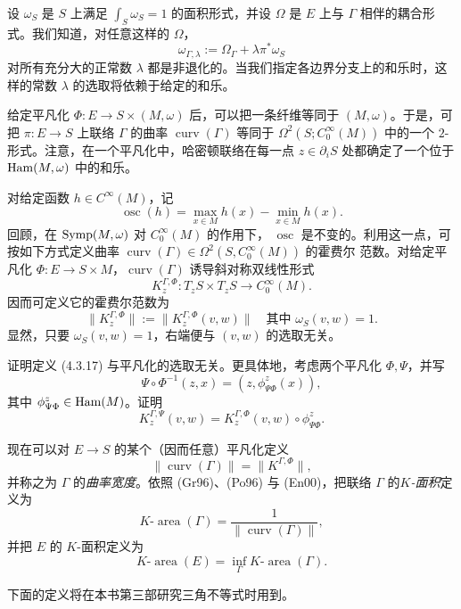设 $\omega_S$ 是 $S$ 上满足 $\int_S\omega_S=1$ 的面积形式，并设
$\Omega$ 是 $E$ 上与 $\Gamma$ 相伴的耦合形式。我们知道，对任意这样的
$\Omega$，
\[
 \omega_{\Gamma,\lambda}:=\Omega_\Gamma+\lambda\pi^*\omega_S
\]
对所有充分大的正常数 $\lambda$ 都是非退化的。当我们指定各边界分支上的和乐时，这样的常数 $\lambda$ 的选取将依赖于给定的和乐。

给定平凡化 $\Phi:E\to S\times(M,\omega)$ 后，可以把一条纤维等同于
$(M,\omega)$。于是，可把 $\pi:E\to S$ 上联络 $\Gamma$ 的曲率
$\operatorname{curv}(\Gamma)$ 等同于
$\Omega^2(S;C_0^\infty(M))$ 中的一个 $2$-形式。注意，在一个平凡化中，哈密顿联络在每一点 $z\in\partial_iS$ 处都确定了一个位于
$\operatorname{Ham}(M,\omega)$ 中的和乐。

对给定函数 $h\in C^\infty(M)$，记
\[
 \operatorname{osc}(h)=\max_{x\in M}h(x)-\min_{x\in M}h(x).
\]
回顾，在 $\operatorname{Symp}(M,\omega)$ 对 $C_0^\infty(M)$ 的作用下，
$\operatorname{osc}$ 是不变的。利用这一点，可按如下方式定义曲率
$\operatorname{curv}(\Gamma)\in\Omega^2(S,C_0^\infty(M))$ 的霍费尔
范数。对给定平凡化 $\Phi:E\to S\times M$，$\operatorname{curv}(\Gamma)$
诱导斜对称双线性形式
\[
 K_z^{\Gamma,\Phi}:T_zS\times T_zS\longrightarrow C_0^\infty(M).
\]
因而可定义它的霍费尔范数为
\begin{equation}
 \|K_z^{\Gamma,\Phi}\|:=
 \|K_z^{\Gamma,\Phi}(v,w)\|
 \quad\text{其中 }\omega_S(v,w)=1.
 \label{eq:curvature-hofer-norm}
\end{equation}
显然，只要 $\omega_S(v,w)=1$，右端便与 $(v,w)$ 的选取无关。

\begin{exercise}\label{ex:curvature-norm-trivialization-independent}
证明定义 (4.3.17) 与平凡化的选取无关。更具体地，考虑两个平凡化
$\Phi,\Psi$，并写
\[
 \Psi\circ\Phi^{-1}(z,x)
 =(z,\phi_{\Psi\Phi}^z(x)),
\]
其中 $\phi_{\Psi\Phi}^z\in\operatorname{Ham}(M)$。证明
\[
 K_z^{\Gamma,\Psi}(v,w)
 =K_z^{\Gamma,\Phi}(v,w)\circ\phi_{\Psi\Phi}^z.
\]
\end{exercise}

现在可以对 $E\to S$ 的某个（因而任意）平凡化定义
\[
 \|\operatorname{curv}(\Gamma)\|=\|K^{\Gamma,\Phi}\|,
\]
并称之为 $\Gamma$ 的\emph{曲率宽度}。依照 (Gr96)、(Po96) 与 (En00)，把联络 $\Gamma$ 的\emph{$K$-面积}定义为
\[
 K\text{-}\operatorname{area}(\Gamma)
 =\frac{1}{\|\operatorname{curv}(\Gamma)\|},
\]
并把 $E$ 的 $K$-面积定义为
\[
 K\text{-}\operatorname{area}(E)
 =\inf_\Gamma K\text{-}\operatorname{area}(\Gamma).
\]

下面的定义将在本书第三部研究三角不等式时用到。

